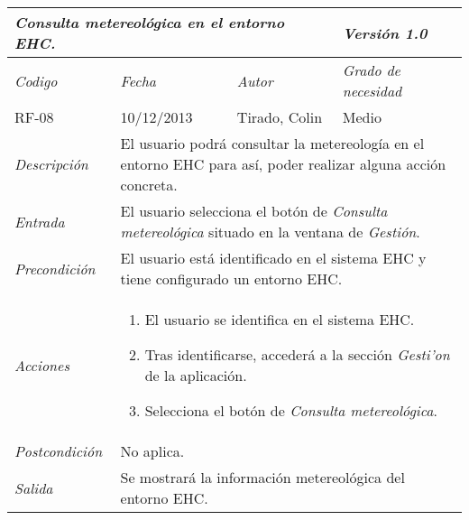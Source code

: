\begin{center}
    \begin{tabular}{|p{3cm}|p{3cm}|p{3cm}|p{3cm}|}
    \hline \multicolumn{3}{|p{9cm}|}{\textit{Consulta metereol\'ogica en el entorno EHC.}} & \textit{Versi\'on 1.0} \\
    \hline \textit{Codigo} & \textit{Fecha} & \textit{Autor} & \textit{Grado de necesidad} \\
    RF-08 & 10/12/2013 & Tirado, Colin & Medio \\
    \hline \textit{Descripci\'on} & \multicolumn{3}{|p{9cm}|}{El usuario podr\'a consultar la metereolog\'ia en el entorno EHC para as\'i, poder realizar alguna acci\'on concreta.} \\
    \hline \textit{Entrada} & \multicolumn{3}{|p{9cm}|}{El usuario selecciona el bot\'on de \textit{Consulta metereol\'ogica} situado en la ventana de \textit{Gesti\'on}.} \\
    \hline \textit{Precondici\'on} & \multicolumn{3}{|p{9cm}|}{El usuario est\'a identificado en el sistema EHC y tiene configurado un entorno EHC.} \\
    \hline \textit{Acciones} & \multicolumn{3}{|p{9cm}|}{
    \begin{enumerate}
    \item El usuario se identifica en el sistema EHC.
    \item Tras identificarse, acceder\'a a la secci\'on \textit{Gesti'on} de la aplicaci\'on.
    \item Selecciona el bot\'on de \textit{Consulta metereol\'ogica}.
    \end{enumerate}
    } \\
    \hline \textit{Postcondici\'on} & \multicolumn{3}{|p{9cm}|}{No aplica.} \\
    \hline \textit{Salida} & \multicolumn{3}{|p{9cm}|}{Se mostrar\'a la informaci\'on metereol\'ogica del entorno EHC.} \\ \hline
    \end{tabular}
\end{center}
